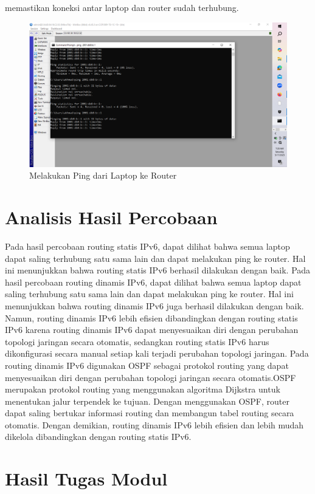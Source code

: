 \begin{enumerate}
    memastikan koneksi antar laptop dan router sudah terhubung.
    \begin{figure}[H]
        \centering
        \includegraphics[width=0.5\linewidth]{ping.png}
        \caption{Melakukan Ping dari Laptop ke Router}
        \label{fig:gambar5}
    \end{figure}
    
\end{enumerate}

\section{Analisis Hasil Percobaan}
Pada hasil percobaan routing statis IPv6, dapat dilihat bahwa semua laptop dapat saling terhubung satu sama lain
dan dapat melakukan ping ke router. Hal ini menunjukkan bahwa routing statis IPv6 berhasil dilakukan dengan baik.
Pada hasil percobaan routing dinamis IPv6, dapat dilihat bahwa semua laptop dapat saling terhubung satu sama lain
dan dapat melakukan ping ke router. Hal ini menunjukkan bahwa routing dinamis IPv6 juga berhasil dilakukan dengan baik.
Namun, routing dinamis IPv6 lebih efisien dibandingkan dengan routing statis IPv6 karena routing dinamis
IPv6 dapat menyesuaikan diri dengan perubahan topologi jaringan secara otomatis, sedangkan routing statis IPv6
harus dikonfigurasi secara manual setiap kali terjadi perubahan topologi jaringan. Pada routing dinamis IPv6 digunakan
OSPF sebagai protokol routing yang dapat menyesuaikan diri dengan perubahan topologi jaringan secara otomatis.OSPF
merupakan protokol routing yang menggunakan algoritma Dijkstra untuk menentukan jalur terpendek ke tujuan.
Dengan menggunakan OSPF, router dapat saling bertukar informasi routing dan membangun tabel routing secara otomatis.
Dengan demikian, routing dinamis IPv6 lebih efisien dan lebih mudah dikelola dibandingkan dengan routing statis IPv6.

\section{Hasil Tugas Modul}


